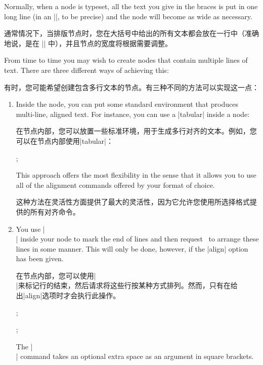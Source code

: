 Normally, when a node is typeset, all the text you give in the braces is put in
one long line (in an |\hbox|, to be precise) and the node will become as wide
as necessary.

通常情况下，当排版节点时，您在大括号中给出的所有文本都会放在一行中（准确地说，是在 |\hbox| 中），并且节点的宽度将根据需要调整。

From time to time you may wish to create nodes that contain multiple lines of
text. There are three different ways of achieving this:

有时，您可能希望创建包含多行文本的节点。有三种不同的方法可以实现这一点：

%
\begin{enumerate}
    \item Inside the node, you can put some standard environment that produces
        multi-line, aligned text. For instance, you can use a |{tabular}|
        inside a node:

        在节点内部，您可以放置一些标准环境，用于生成多行对齐的文本。例如，您可以在节点内部使用|{tabular}|：

\begin{codeexample}[width=5cm]
\tikz {};
\end{codeexample}
        This approach offers the most flexibility in the sense that it allows
        you to use all of the alignment commands offered by your format of
        choice.

        这种方法在灵活性方面提供了最大的灵活性，因为它允许您使用所选择格式提供的所有对齐命令。


    \item You use |\\| inside your node to mark the end of lines and then
        request \tikzname\ to arrange these lines in some manner. This will
        only be done, however, if the |align| option has been given.

        在节点内部，您可以使用|\\|来标记行的结束，然后请求\tikzname 将这些行按某种方式排列。然而，只有在给出|align|选项时才会执行此操作。
\begin{codeexample}[]
\tikz[align=left] ;
\end{codeexample}
\begin{codeexample}[]
\tikz[align=center] ;
\end{codeexample}
        The |\\| command takes an optional extra space as an argument in square
        brackets.
        

\end{enumerate}
